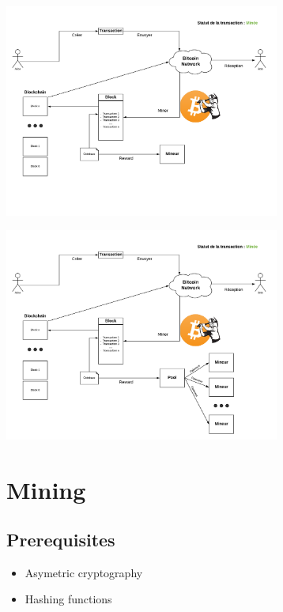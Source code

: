 \documentclass{beamer}
\begin{document}
\begin{frame}
    \begin{center}
        \includegraphics[height=7cm]{images/explanation-7.png}
    \end{center}
\end{frame}

\begin{frame}
    \begin{center}
        \includegraphics[height=7cm]{images/explanation-8.png}
    \end{center}
\end{frame}

\section{Mining}
\subsection{Prerequisites}

\begin{frame}
    \begin{itemize}
        \item Asymetric cryptography
        \item Hashing functions
    \end{itemize}
\end{frame}
\end{document}
